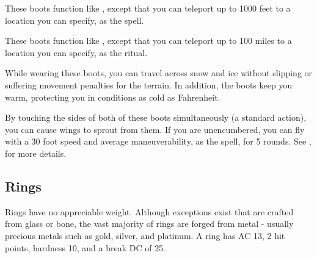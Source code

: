 
 These boots function like , except that you can teleport up to 1000 feet to a location you can specify, as the  spell.


 These boots function like , except that you can teleport up to 100 miles to a location you can specify, as the  ritual.


 While wearing these boots, you can travel across snow and ice without slipping or suffering movement penalties for the terrain. In addition, the boots keep you warm, protecting you in conditions as cold as  Fahrenheit.


 By touching the sides of both of these boots simultaneously (a standard action), you can cause wings to sprout from them. If you are unencumbered, you can fly with a 30 foot speed and average maneuverability, as the  spell, for 5 rounds. See , for more details.


\subsection{Rings}

 Rings have no appreciable weight. Although exceptions exist that are crafted from glass or bone, the vast majority of rings are forged from metal - usually precious metals such as gold, silver, and platinum. A ring has AC 13, 2 hit points, hardness 10, and a break DC of 25.

